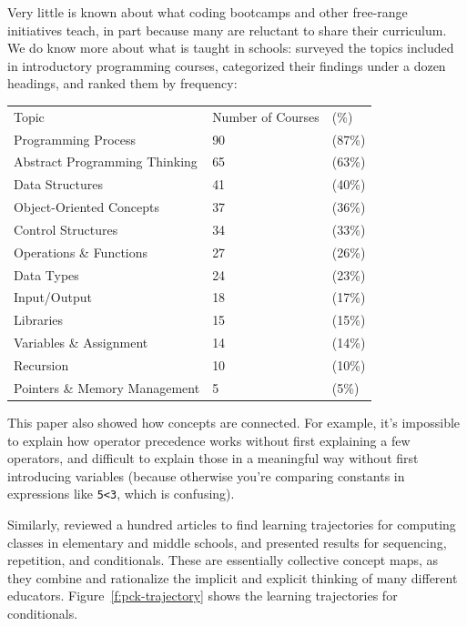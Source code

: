 Very little is known about what coding bootcamps and other free-range
initiatives teach, in part because many are reluctant to share their
curriculum. We do know more about what is taught in schools:
\cite{Luxt2017} surveyed the topics included in introductory
programming courses, categorized their findings under a dozen headings,
and ranked them by frequency:

\begin{longtable}[]{@{}lll@{}}
Topic & Number of Courses & (\%)\tabularnewline
Programming Process & 90 & (87\%)\tabularnewline
Abstract Programming Thinking & 65 & (63\%)\tabularnewline
Data Structures & 41 & (40\%)\tabularnewline
Object-Oriented Concepts & 37 & (36\%)\tabularnewline
Control Structures & 34 & (33\%)\tabularnewline
Operations \& Functions & 27 & (26\%)\tabularnewline
Data Types & 24 & (23\%)\tabularnewline
Input/Output & 18 & (17\%)\tabularnewline
Libraries & 15 & (15\%)\tabularnewline
Variables \& Assignment & 14 & (14\%)\tabularnewline
Recursion & 10 & (10\%)\tabularnewline
Pointers \& Memory Management & 5 & (5\%)\tabularnewline
\end{longtable}

This paper also showed how concepts are connected. For example, it's
impossible to explain how operator precedence works without first
explaining a few operators, and difficult to explain those in a
meaningful way without first introducing variables (because otherwise
you're comparing constants in expressions like \texttt{5\textless{}3}, which is
confusing).

Similarly, \cite{Rich2017} reviewed a hundred articles to find
learning trajectories for computing classes in elementary and middle
schools, and presented results for sequencing, repetition, and
conditionals. These are essentially collective concept maps, as they
combine and rationalize the implicit and explicit thinking of many
different educators. Figure~\ref{f:pck-trajectory} shows the learning
trajectories for conditionals.

